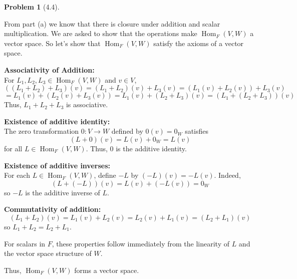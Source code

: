 \documentclass[12pt]{article}
\theoremstyle{definition}
\newtheorem{problem}{Problem}
\DeclareMathOperator{\Hom}{Hom}
\begin{document}
\begin{problem}[4.4]
\begin{enumerate}[label=(\alph*)]
        \begin{solution}    
            From part (a) we know that there is closure under addition and scalar multiplication.
            We are asked to show that the operations make $\Hom_F(V, W)$ a vector space. So let's 
            show that $\Hom_F(V, W)$ satisfy the axioms of a vector space.
            
            \textbf{Associativity of Addition:}\\ 
            For $L_1, L_2, L_3 \in \Hom_F(V, W)$ and $v \in V$,
            \[ ((L_1 + L_2) + L_3)(v) = (L_1 + L_2)(v) + L_3(v) = (L_1(v) + L_2(v)) + L_3(v) \]
            \[ = L_1(v) + (L_2(v) + L_3(v)) = L_1(v) + (L_2 + L_3)(v) = (L_1 + (L_2 + L_3))(v) \]
            Thus, $L_1 + L_2 + L_3$ is associative.
            
            \textbf{Existence of additive identity:}\\
            The zero transformation $0: V \to W$ defined by $0(v) = 0_W$ satisfies
            \[ (L + 0)(v) = L(v) + 0_W = L(v) \]
            for all $L \in \Hom_F(V, W)$. Thus, $0$ is the additive identity.
            
            \textbf{Existence of additive inverses:}\\
            For each $L \in \Hom_F(V, W)$, define $-L$ by $(-L)(v) = -L(v)$. Indeed,
            \[ (L + (-L))(v) = L(v) + (-L(v)) = 0_W \]
            so $-L$ is the additive inverse of $L$.
            
            \textbf{Commutativity of addition:}
            \[ (L_1 + L_2)(v) = L_1(v) + L_2(v) = L_2(v) + L_1(v) = (L_2 + L_1)(v) \]
            so $L_1 + L_2 = L_2 + L_1$.
            
            For scalars in $F$, these properties follow immediately from the linearity of $L$
            and the vector space structure of $W$.

            Thus, $\Hom_F(V, W)$ forms a vector space.
        \end{solution}
    \end{enumerate}
\end{problem}
\end{document}
